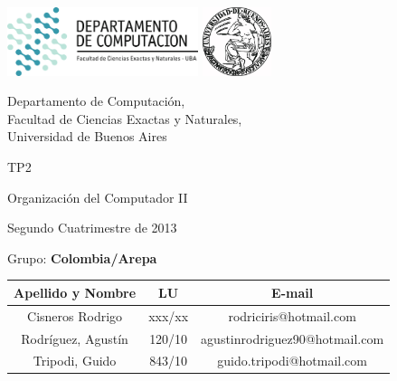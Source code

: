\documentclass[a4paper,10pt,twoside]{article}
\begin{document}


\thispagestyle{caratula}

\begin{center}

\includegraphics[height=2cm]{DC.png} 
\hfill
\includegraphics[height=2cm]{UBA.jpg} 

\vspace{2cm}

Departamento de Computación,\\
Facultad de Ciencias Exactas y Naturales,\\
Universidad de Buenos Aires

\vspace{4cm}

\begin{Huge}
TP2
\end{Huge}

\vspace{0.5cm}

\begin{Large}
Organización del Computador II
\end{Large}

\vspace{1cm}

Segundo Cuatrimestre de 2013

\vspace{4cm}

Grupo: \textbf{Colombia/Arepa}

\vspace{0.5cm}

\begin{tabular}{|c|c|c|}
\hline
Apellido y Nombre & LU & E-mail\\
\hline
Cisneros Rodrigo		& xxx/xx & rodriciris@hotmail.com\\
Rodr\'iguez, Agust\'in	& 120/10 & agustinrodriguez90@hotmail.com\\
Tripodi, Guido			& 843/10 & guido.tripodi@hotmail.com\\
\hline
\end{tabular}

\end{center}
\end{document}
